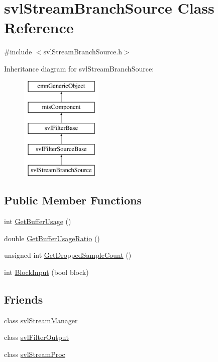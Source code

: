 \hypertarget{classsvl_stream_branch_source}{\section{svl\-Stream\-Branch\-Source Class Reference}
\label{classsvl_stream_branch_source}
}


{\ttfamily \#include $<$svl\-Stream\-Branch\-Source.\-h$>$}

Inheritance diagram for svl\-Stream\-Branch\-Source\-:\begin{figure}[H]
\begin{center}
\leavevmode
\includegraphics[height=5.000000cm]{d1/d79/classsvl_stream_branch_source}
\end{center}
\end{figure}
\subsection*{Public Member Functions}
\begin{DoxyCompactItemize}
\item 
int \hyperlink{classsvl_stream_branch_source_a889d5b782862d6571235050785b688e0}{Get\-Buffer\-Usage} ()
\item 
double \hyperlink{classsvl_stream_branch_source_a15d0b0c4c9693228f39489c2faec21cf}{Get\-Buffer\-Usage\-Ratio} ()
\item 
unsigned int \hyperlink{classsvl_stream_branch_source_a3f828232886b81521a2e742e3f0d01da}{Get\-Dropped\-Sample\-Count} ()
\item 
int \hyperlink{classsvl_stream_branch_source_ae1d4a50f0c26fe04e7e0ffdf35358794}{Block\-Input} (bool block)
\end{DoxyCompactItemize}
\subsection*{Friends}
\begin{DoxyCompactItemize}
\item 
class \hyperlink{classsvl_stream_branch_source_ab5eee58544f2ce644140e932afbe32db}{svl\-Stream\-Manager}
\item 
class \hyperlink{classsvl_stream_branch_source_a3f45c3511fc124d190c8ffb5953025f6}{svl\-Filter\-Output}
\item 
class \hyperlink{classsvl_stream_branch_source_a6a9ee1dec5ca263793dca09411295245}{svl\-Stream\-Proc}
\end{DoxyCompactItemize}
